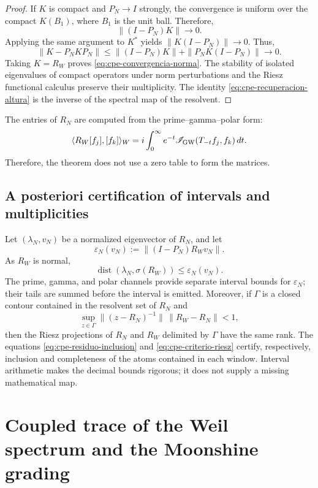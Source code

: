 \begin{proof}
If \(K\) is compact and \(P_N\to I\) strongly, the convergence is uniform
over the compact \(K(B_1)\), where \(B_1\) is the unit ball. Therefore,
\[
 \|(I-P_N)K\|\longrightarrow0.
\]
Applying the same argument to \(K^*\) yields
\(\|K(I-P_N)\|\to0\). Thus,
\[
 \|K-P_NKP_N\|
 \leq\|(I-P_N)K\|+\|P_NK(I-P_N)\|\longrightarrow0.
\]
Taking \(K=R_W\) proves \eqref{eq:cpe-convergencia-norma}. The
stability of isolated eigenvalues of compact operators under
norm perturbations and the Riesz functional calculus preserve their
multiplicity. The identity \eqref{eq:cpe-recuperacion-altura} is the inverse
of the spectral map of the resolvent.
\end{proof}

The entries of \(R_N\) are computed from the prime--gamma--polar form:
\[
 \langle R_W[f_j],[f_k]\rangle_W
 =i\int_0^\infty e^{-t}
 \mathscr I_{\rm GW}(T_{-t}f_j,f_k)\,dt.
\]
Therefore, the theorem does not use a zero table to form the matrices.

\subsection{A posteriori certification of intervals and multiplicities}

Let \((\lambda_N,v_N)\) be a normalized eigenvector of \(R_N\), and let
\[
 \varepsilon_N(v_N)
 :=\|(I-P_N)R_Wv_N\|.
\]
As \(R_W\) is normal,
\begin{equation}
 \operatorname{dist}(\lambda_N,\sigma(R_W))
 \leq\varepsilon_N(v_N).
 \label{eq:cpe-residuo-inclusion}
\end{equation}
The prime, gamma, and polar channels provide separate interval bounds
for \(\varepsilon_N\); their tails are summed before the interval is emitted.
Moreover, if \(\Gamma\) is a closed contour contained in the resolvent set of
\(R_N\) and
\begin{equation}
 \sup_{z\in\Gamma}
 \|(z-R_N)^{-1}\|\,\|R_W-R_N\|<1,
 \label{eq:cpe-criterio-riesz}
\end{equation}
then the Riesz projections of \(R_N\) and \(R_W\) delimited by
\(\Gamma\) have the same rank. The equations
\eqref{eq:cpe-residuo-inclusion} and \eqref{eq:cpe-criterio-riesz} certify,
respectively, inclusion and completeness of the atoms contained in each
window. Interval arithmetic makes the decimal bounds rigorous; it does not supply a
missing mathematical map.

\section{Coupled trace of the Weil spectrum and the Moonshine grading}
\label{sec:cpe-traza-rh-moonshine}

